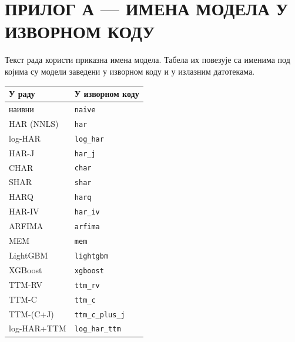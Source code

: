 \chapter*{ПРИЛОГ А — ИМЕНА МОДЕЛА У ИЗВОРНОМ КОДУ}
\label{app:imena}

Текст рада користи приказна имена модела. Табела их повезује са именима под којима су
модели заведени у изворном коду и у излазним датотекама.

\begin{center}
\begin{tabular}{ll}
\toprule
У раду & У изворном коду \\
\midrule
наивни        & \texttt{naive} \\
HAR (NNLS)    & \texttt{har} \\
log-HAR       & \texttt{log\_har} \\
HAR-J         & \texttt{har\_j} \\
CHAR          & \texttt{char} \\
SHAR          & \texttt{shar} \\
HARQ          & \texttt{harq} \\
HAR-IV        & \texttt{har\_iv} \\
ARFIMA        & \texttt{arfima} \\
MEM           & \texttt{mem} \\
LightGBM      & \texttt{lightgbm} \\
XGBoost       & \texttt{xgboost} \\
TTM-RV        & \texttt{ttm\_rv} \\
TTM-C         & \texttt{ttm\_c} \\
TTM-(C+J)     & \texttt{ttm\_c\_plus\_j} \\
log-HAR+TTM   & \texttt{log\_har\_ttm} \\
\bottomrule
\end{tabular}
\end{center}
